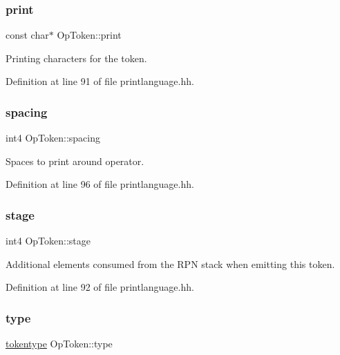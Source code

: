 \subsubsection{\texorpdfstring{print}{print}}
{\footnotesize\ttfamily const char$\ast$ Op\+Token\+::print}



Printing characters for the token. 



Definition at line 91 of file printlanguage.\+hh.

\mbox{\label{class_op_token_a0e083c20738e711bc344f5ad8c824da5}} 
\subsubsection{\texorpdfstring{spacing}{spacing}}
{\footnotesize\ttfamily int4 Op\+Token\+::spacing}



Spaces to print around operator. 



Definition at line 96 of file printlanguage.\+hh.

\mbox{\label{class_op_token_a542686a26ddc09726ca70ec466d4f7f8}} 
\subsubsection{\texorpdfstring{stage}{stage}}
{\footnotesize\ttfamily int4 Op\+Token\+::stage}



Additional elements consumed from the R\+PN stack when emitting this token. 



Definition at line 92 of file printlanguage.\+hh.

\mbox{\label{class_op_token_a5669fe4bcabbd8afd66cc8b5d85c0f55}} 
\subsubsection{\texorpdfstring{type}{type}}
{\footnotesize\ttfamily \mbox{\hyperlink{class_op_token_af41c7f108d5662ede7765c5a6c44eaff}{tokentype}} Op\+Token\+::type}



